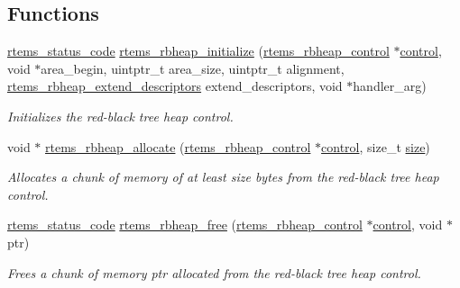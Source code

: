 \subsection*{Functions}
\begin{DoxyCompactItemize}
\item 
\mbox{\hyperlink{group__ClassicStatus_ga545d41846817eaba6143d52ee4d9e9fe}{rtems\+\_\+status\+\_\+code}} \mbox{\hyperlink{group__RBHeap_ga0274b53388fbaefe582c6c1752539b16}{rtems\+\_\+rbheap\+\_\+initialize}} (\mbox{\hyperlink{structrtems__rbheap__control}{rtems\+\_\+rbheap\+\_\+control}} $\ast$\mbox{\hyperlink{structcontrol}{control}}, void $\ast$area\+\_\+begin, uintptr\+\_\+t area\+\_\+size, uintptr\+\_\+t alignment, \mbox{\hyperlink{group__RBHeap_gaa15b8f5425b4d2aa188607bb9941fb20}{rtems\+\_\+rbheap\+\_\+extend\+\_\+descriptors}} extend\+\_\+descriptors, void $\ast$handler\+\_\+arg)
\begin{DoxyCompactList}\small\item\em Initializes the red-\/black tree heap {\itshape control}. \end{DoxyCompactList}\item 
void $\ast$ \mbox{\hyperlink{group__RBHeap_ga2eb3695546542f459cc424d1a36ea6f6}{rtems\+\_\+rbheap\+\_\+allocate}} (\mbox{\hyperlink{structrtems__rbheap__control}{rtems\+\_\+rbheap\+\_\+control}} $\ast$\mbox{\hyperlink{structcontrol}{control}}, size\+\_\+t \mbox{\hyperlink{sun4u_2tte_8h_a245260f6f74972558f61b85227df5aae}{size}})
\begin{DoxyCompactList}\small\item\em Allocates a chunk of memory of at least {\itshape size} bytes from the red-\/black tree heap {\itshape control}. \end{DoxyCompactList}\item 
\mbox{\hyperlink{group__ClassicStatus_ga545d41846817eaba6143d52ee4d9e9fe}{rtems\+\_\+status\+\_\+code}} \mbox{\hyperlink{group__RBHeap_ga1bd7fd933947dcdf26a49f4ce10418b4}{rtems\+\_\+rbheap\+\_\+free}} (\mbox{\hyperlink{structrtems__rbheap__control}{rtems\+\_\+rbheap\+\_\+control}} $\ast$\mbox{\hyperlink{structcontrol}{control}}, void $\ast$ptr)
\begin{DoxyCompactList}\small\item\em Frees a chunk of memory {\itshape ptr} allocated from the red-\/black tree heap {\itshape control}. \end{DoxyCompactList}\item 
\mbox{\label{group__RBHeap_ga9896930146188b96df52a73099cf8d10}} 

\end{DoxyCompactItemize}

